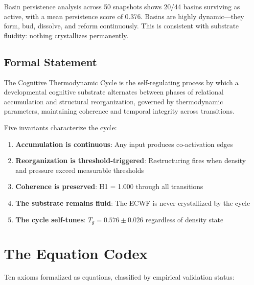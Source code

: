 \documentclass[11pt,a4paper]{article}
\begin{document}
Basin persistence analysis across 50 snapshots shows 20/44 basins surviving as active, with a mean persistence score of 0.376. Basins are highly dynamic---they form, bud, dissolve, and reform continuously. This is consistent with substrate fluidity: nothing crystallizes permanently.

\subsection{Formal Statement}

The Cognitive Thermodynamic Cycle is the self-regulating process by which a developmental cognitive substrate alternates between phases of relational accumulation and structural reorganization, governed by thermodynamic parameters, maintaining coherence and temporal integrity across transitions.

Five invariants characterize the cycle:

\begin{enumerate}[nosep]
    \item \textbf{Accumulation is continuous}: Any input produces co-activation edges
    \item \textbf{Reorganization is threshold-triggered}: Restructuring fires when density and pressure exceed measurable thresholds
    \item \textbf{Coherence is preserved}: H1 = 1.000 through all transitions
    \item \textbf{The substrate remains fluid}: The ECWF is never crystallized by the cycle
    \item \textbf{The cycle self-tunes}: $T_g = 0.576 \pm 0.026$ regardless of density state
\end{enumerate}

\section{The Equation Codex}

Ten axioms formalized as equations, classified by empirical validation status:
\end{document}
